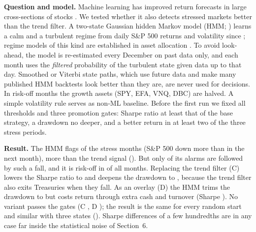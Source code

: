 \textbf{Question and model.} Machine learning has improved return forecasts in large cross-sections of stocks
\citep{gu2020}. We tested whether it also detects stressed markets better than the trend filter. A two-state Gaussian hidden Markov model (HMM; \citealp{hamilton1989,rabiner1989}) learns a calm and a
turbulent regime from daily S\&P 500 returns and volatility since ; regime models of this kind are
established in asset allocation \citep{ang2002,nystrup2018}. To avoid look-ahead, the model is re-estimated every
December on past data only, and each month uses the \emph{filtered} probability of the turbulent state given data up
to that day. Smoothed or Viterbi state paths, which use future data and make many published HMM backtests look better
than they are, are never used for decisions. In risk-off months the growth assets (SPY, EFA, VNQ, DBC) are halved.
A simple volatility rule serves as non-ML baseline. Before the first run we fixed all thresholds and three promotion
gates: Sharpe ratio at least that of the base strategy, a drawdown no deeper, and a better return in at least two of
the three stress periods.

\begin{table}[!htb]
\centering\small
\caption{Machine-learning variants, --, net of  per unit of turnover}\label{tab:ml}
\end{table}

\textbf{Result.} The HMM flags  of the  stress months (S\&P 500 down more than
 in the next month), more than the trend signal (). But only  of its
alarms are followed by such a fall, and it is risk-off in  of all months. Replacing the trend filter
(C) lowers the Sharpe ratio to  and deepens the drawdown to , because the trend filter
also exits Treasuries when they fall. As an overlay (D) the HMM trims the drawdown to  but costs return
through extra cash and turnover (Sharpe ). No variant passes the gates (C ,
D ); the result is the same for every random start and similar with three states
(). Sharpe differences of a few hundredths are in any case far inside the statistical noise of
Section~6.

